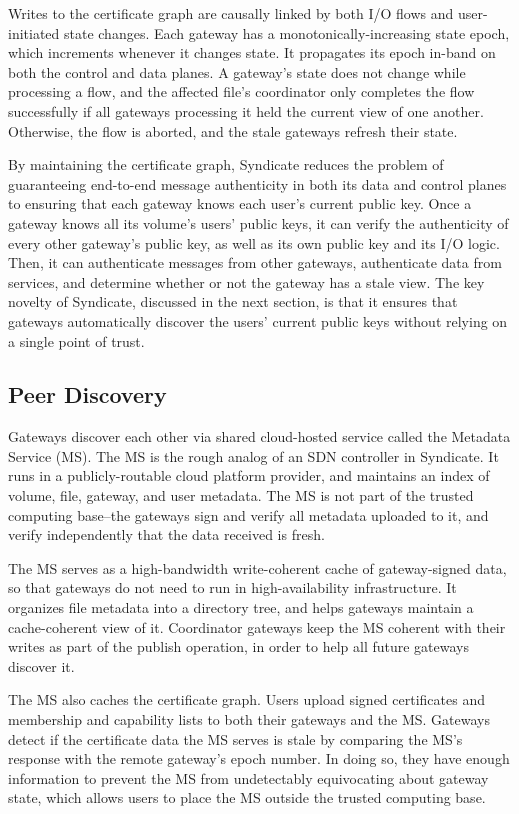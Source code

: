 Writes to the certificate graph are causally linked by both I/O flows and
user-initiated state changes. Each gateway has a monotonically-increasing state
epoch, which increments whenever it changes state. It propagates its epoch
in-band on both the control and data planes. A gateway's state does not
change while processing a flow, and the affected file's coordinator only
completes the flow successfully if all gateways processing it held the current
view of one another. Otherwise, the flow is aborted, and the stale gateways
refresh their state.


By maintaining the certificate graph, Syndicate reduces the problem of
guaranteeing end-to-end message authenticity in both its data and control planes
to ensuring that each gateway knows each user's current public key. Once a
gateway knows all its volume's users' public keys, it can verify the
authenticity of every other gateway's public key, as well as its own public
key and its I/O logic. Then, it can authenticate messages from other gateways,
authenticate data from services, and determine whether or not the gateway has a
stale view. The key novelty of Syndicate, discussed in the next section, is that
it ensures that gateways automatically discover the users' current public
keys without relying on a single point of trust.

\subsection{Peer Discovery}

Gateways discover each other via shared cloud-hosted service called the Metadata
Service (MS). The MS is the rough analog of an SDN controller in Syndicate. It
runs in a publicly-routable cloud platform provider, and maintains an index of
volume, file, gateway, and user metadata. The MS is not part of the trusted
computing base--the gateways sign and verify all metadata uploaded to it, and
verify independently that the data received is fresh.


The MS serves as a high-bandwidth write-coherent cache of gateway-signed data,
so that gateways do not need to run in high-availability infrastructure. It
organizes file metadata into a directory tree, and helps gateways maintain a
cache-coherent view of it. Coordinator gateways keep the MS coherent with their
writes as part of the publish operation, in order to help all future gateways
discover it.


The MS also caches the certificate graph. Users upload signed certificates and
membership and capability lists to both their gateways and the MS. Gateways
detect if the certificate data the MS serves is stale by comparing the MS's
response with the remote gateway's epoch number. In doing so, they have
enough information to prevent the MS from undetectably equivocating about
gateway state, which allows users to place the MS outside the trusted computing
base.



